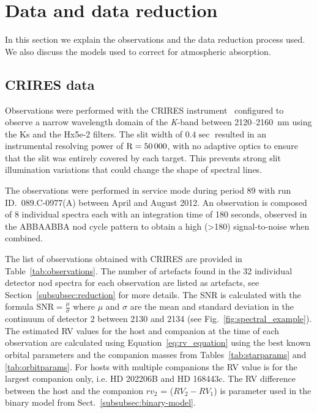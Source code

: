 \documentclass[fleqn,usenatbib]{mnras}
\newcommand*\rd{\color{red}}
\begin{document}




\section{Data and data reduction}
\label{sec:data}
In this section we explain the observations and the data reduction process used. We also discuss the models used to correct for atmospheric absorption.


\subsection{CRIRES data}
\label{subsec:CRIRES} 
Observations were performed with the CRIRES instrument~\citep{kaeufl_crires_2004} configured to observe a narrow wavelength domain of the \textit{K}-band between 2120--2160~nm using the {Ks} and the {Hx5e-2} filters. The slit width of \(0.4\sec \) resulted in an instrumental resolving power of \(\rm R=50\,000\), with no adaptive optics to ensure that the slit was entirely covered by each target. This prevents strong slit illumination variations that could change the shape of spectral lines.

The observations were performed in service mode during period 89 with run ID.~089.C-0977(A) between April and August 2012. An observation is composed of 8 individual spectra each with an integration time of 180 seconds, observed in the ABBAABBA nod cycle pattern to obtain a high (>180) signal-to-noise when combined. 

{\rd The list of observations obtained with CRIRES are provided in Table~\ref{tab:observations}. The number of artefacts found in the 32 individual detector nod spectra for each observation are listed as artefacts, see Section~\ref{subsubsec:reduction} for more details. The SNR is calculated with the formula \(\textrm{SNR} = \frac{\mu}{\sigma}\) where $\mu$ and $\sigma$ are the mean and standard deviation in the continuum of detector 2 between 2130 and 2134 (see Fig.~\ref{fig:spectral_example}).
The estimated RV values for the host and companion at the time of each observation are calculated using Equation~\ref{eq:rv_equation} using the best known orbital parameters and the companion masses from Tables~\ref{tab:starparams} and \ref{tab:orbitparams}. For hosts with multiple companions the RV value is for the largest companion only, i.e. {HD 202206}B and {HD 168443}c. The RV difference between the host and the companion \(rv_2\) = (\(RV_2 - RV_1\)) is parameter used in the binary model from Sect.~\ref{subsubsec:binary-model}. }
\end{document}
